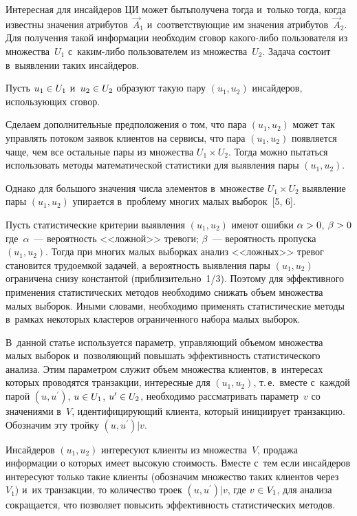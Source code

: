 \begin{multicols}{2}
  Интересная для инсайдеров ЦИ может быть\linebreak получена тогда и~только тогда, 
когда известны значения атрибутов~$\vec{A}_1$ и~соответствующие им значения 
атрибутов~$\vec{A}_2$. Для получения такой информации необходим сговор 
какого-либо пользователя из множества~$U_1$ с~каким-либо пользователем из 
множества~$U_2$. Задача состоит в~выявлении таких инсайдеров. 
  
  Пусть $u_1\hm\in U_1$  и~$u_2\hm\in U_2$ образуют такую пару $(u_1, u_2)$ 
инсайдеров, использующих сговор. 
  
  Сделаем дополнительные предположения о том, что пара  $(u_1, u_2)$ может 
так управлять потоком заявок клиентов на сервисы, что пара $(u_1, u_2)$ 
появляется чаще, чем все остальные пары из множества $U_1\times U_2$. Тогда 
можно пытаться использовать методы математической статистики для выявления 
пары $(u_1, u_2)$. 
  
  Однако для большого значения числа элементов в~множестве $U_1\times U_2$ 
выявление пары $(u_1, u_2)$ упирается в~проблему многих малых выборок~[5, 6]. 
  
  Пусть статистические критерии выявления $(u_1, u_2)$ имеют ошибки 
$\alpha\hm>0$, $\beta\hm>0$ где~$\alpha$~---  вероятность <<ложной>> тревоги; 
$\beta$~--- вероятность пропуска $(u_1, u_2)$.  Тогда при многих малых выборках 
анализ <<ложных>> тревог становится трудоемкой задачей, а вероятность 
выявления пары $(u_1, u_2)$ ограничена снизу константой (приблизительно~1/3). 
Поэтому для эффективного применения статистических методов необходимо 
снижать объем множества малых выборок. Иными словами, необходимо 
применять статистические методы в~рамках некоторых кластеров ограниченного 
набора малых выборок. 
  
  В~данной статье используется параметр, управ\-ля\-ющий объемом множества 
малых выборок и~поз\-во\-ля\-ющий повышать эффективность статистического 
анализа. Этим параметром служит объем множества клиентов, в~интересах 
которых проводятся транзакции, интересные для $(u_1, u_2)$, т.\,е.\ вмес\-те 
с~каждой парой $(u, u^\prime)$, $u\hm\in U_1$, $u^\prime\hm\in U_2$, необходимо 
рассматривать параметр~$v$ со значениями в~$V$, идентифицирующий клиента, 
который инициирует транзакцию. Обозначим эту тройку $(u,u^\prime)\vert v$. 
  
  Инсайдеров $(u_1, u_2)$ интересуют клиенты из множества~$V$, продажа 
информации о которых имеет высокую стоимость. Вместе с~тем если инсайдеров 
интересуют только такие клиенты (обозначим множество таких клиентов 
через~$V_1$) и~их транзакции, то количество троек $(u, u^\prime)\vert v$, где 
$v\hm\in V_1$, для анализа сокращается, что позволяет повысить эффективность 
статистических методов.


\end{multicols}
